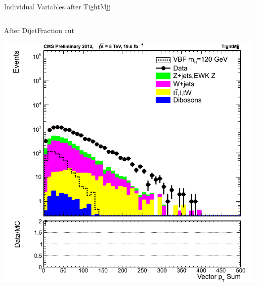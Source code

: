 \documentclass[8pt]{beamer}
\begin{document}
\begin{frame}{Individual Variables after TightMjj}
\begin{columns}
\begin{block}{After DijetFraction cut}
  \begin{center}
  \includegraphics[width=1.00\textwidth]{img/vecSumTriObjectPt_2012_TightMjj_log.png}
  \end{center}

\end{block}
  
\end{columns}
 
\end{frame}
\end{document}
